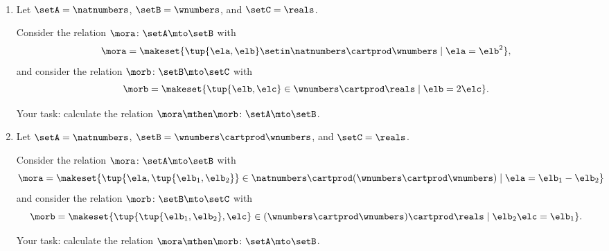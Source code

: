 

\begin{gradedexercise}[ComposingRelations]
    \
    \begin{enumerate}
        \item
              Let $\setA = \natnumbers$, $\setB = \wnumbers$, and $\setC = \reals$.

              Consider the relation $\mora \colon \setA \mto \setB$ with
              \begin{equation}
                  \mora = \makeset{ \tup{\ela, \elb} \setin \natnumbers \cartprod \wnumbers \mid \ela = \elb^2 },
              \end{equation}
              and consider the relation $\morb \colon \setB \mto \setC$ with
              \begin{equation}
                  \morb = \makeset{ \tup{\elb, \elc} \in \wnumbers \cartprod \reals \mid \elb = 2 \elc}.
              \end{equation}

              Your task: calculate the relation $\mora \mthen \morb \colon \setA \mto \setB$.

        \item
              Let $\setA = \natnumbers$, $\setB = \wnumbers \cartprod \wnumbers$, and $\setC = \reals$.

              Consider the relation $\mora \colon \setA \mto \setB$ with
              \begin{equation}
                  \mora = \makeset{\tup{\ela, \tup{\elb_1, \elb_2}} \in \natnumbers \cartprod (\wnumbers \cartprod \wnumbers) \mid \ela = \elb_1 - \elb_2}
              \end{equation}
              and consider the relation $\morb \colon \setB \mto \setC$ with
              \begin{equation}
                  \morb = \makeset{ \tup{\tup{\elb_1, \elb_2}, \elc} \in (\wnumbers \cartprod \wnumbers) \cartprod \reals \mid \elb_2 \elc = \elb_1}.
              \end{equation}

              Your task: calculate the relation $\mora \mthen \morb \colon \setA \mto \setB$.
    \end{enumerate}

\end{gradedexercise}
